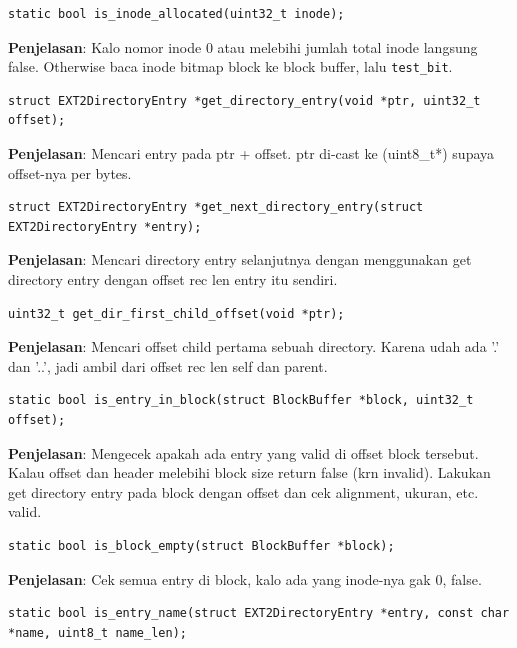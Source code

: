 \begin{lstlisting}
static bool is_inode_allocated(uint32_t inode);
\end{lstlisting}

\textbf{Penjelasan}: Kalo nomor inode 0 atau melebihi jumlah total inode langsung false. Otherwise baca inode bitmap block ke block buffer, lalu \texttt{test\_bit}.

\begin{lstlisting}
struct EXT2DirectoryEntry *get_directory_entry(void *ptr, uint32_t offset);
\end{lstlisting}

\textbf{Penjelasan}: Mencari entry pada ptr + offset. ptr di-cast ke (uint8\_t*) supaya offset-nya per bytes.

\begin{lstlisting}
struct EXT2DirectoryEntry *get_next_directory_entry(struct EXT2DirectoryEntry *entry);
\end{lstlisting}

\textbf{Penjelasan}: Mencari directory entry selanjutnya dengan menggunakan get directory entry dengan offset rec len entry itu sendiri.

\begin{lstlisting}
uint32_t get_dir_first_child_offset(void *ptr);
\end{lstlisting}

\textbf{Penjelasan}: Mencari offset child pertama sebuah directory. Karena udah ada '.' dan '..', jadi ambil dari offset rec len self dan parent.

\begin{lstlisting}
static bool is_entry_in_block(struct BlockBuffer *block, uint32_t offset);
\end{lstlisting}

\textbf{Penjelasan}: Mengecek apakah ada entry yang valid di offset block tersebut. Kalau offset dan header melebihi block size return false (krn invalid). Lakukan get directory entry pada block dengan offset dan cek alignment, ukuran, etc. valid.

\begin{lstlisting}
static bool is_block_empty(struct BlockBuffer *block);
\end{lstlisting}

\textbf{Penjelasan}: Cek semua entry di block, kalo ada yang inode-nya gak 0, false.

\begin{lstlisting}
static bool is_entry_name(struct EXT2DirectoryEntry *entry, const char *name, uint8_t name_len);
\end{lstlisting}


